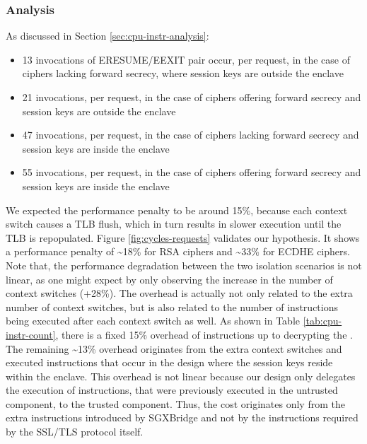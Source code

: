 \documentclass[../../../main.tex]{subfiles}
\begin{document}
\subsubsection*{Analysis}
As discussed in Section \ref{sec:cpu-instr-analysis}:
\begin{itemize}
  \item 13 invocations of ERESUME/EEXIT pair occur, per request, in
    the case of ciphers lacking forward secrecy, where session keys are
    outside the enclave
  \item 21 invocations, per request, in the case of ciphers offering
    forward secrecy and session keys are outside the enclave
  \item 47 invocations, per request, in the case of ciphers lacking
    forward secrecy and session keys are inside the enclave
  \item 55 invocations, per request, in the case of ciphers offering
    forward secrecy and session keys are inside the enclave
\end{itemize}
We expected the performance penalty to be around 15\%, because each
context switch causes a TLB flush, which in turn results in slower
execution until the TLB is repopulated. Figure
\ref{fig:cycles-requests} validates our hypothesis. It shows a
performance penalty of \textasciitilde18\% for RSA ciphers and
\textasciitilde33\% for ECDHE ciphers. Note that, the performance
degradation between the two isolation scenarios is not linear, as one
might expect by only observing the increase in the number of context
switches (+28\%). The overhead is actually not only related
to the extra number of context switches, but is also related to the
number of instructions being executed after each context switch
as well. As shown in Table \ref{tab:cpu-instr-count}, there is
a fixed 15\% overhead of instructions up to decrypting the
\premaster. The remaining \textasciitilde13\% overhead originates
from the extra context switches and executed instructions that occur
in the design where the session keys reside within the enclave. This
overhead is not linear because our design only delegates the
execution of instructions, that were previously executed in the
untrusted component, to the trusted component. Thus, the cost
originates only from the extra instructions introduced by SGXBridge
and not by the instructions required by the SSL/TLS protocol itself.

\end{document}

